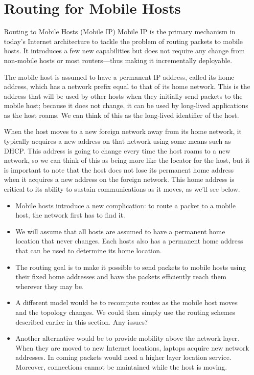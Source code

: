 \documentclass[twoside]{article}
\begin{document}
\section*{Routing for Mobile Hosts}
Routing to Mobile Hosts (Mobile IP) Mobile IP is the primary mechanism in today's Internet architecture to tackle the problem of routing packets to mobile hosts. It introduces a few new capabilities but does not require any change from non-mobile hosts or most routers—thus making it incrementally deployable.

\newline The mobile host is assumed to have a permanent IP address, called its home address, which has a network prefix equal to that of its home network. This is the address that will be used by other hosts when they initially send packets to the mobile host; because it does not change, it can be used by long-lived applications as the host roams. We can think of this as the long-lived identifier of the host.

\newline When the host moves to a new foreign network away from its home network, it typically acquires a new address on that network using some means such as DHCP. This address is going to change every time the host roams to a new network, so we can think of this as being more like the locator for the host, but it is important to note that the host does not lose its permanent home address when it acquires a new address on the foreign network. This home address is critical to its ability to sustain communications as it moves, as we'll see below.
\begin{itemize}
    \item Mobile hosts introduce a new complication: to route a packet to a
mobile host, the network first has to find it.
    \item We will assume that all hosts are assumed to have a permanent
home location that never changes. Each hosts also has a permanent
home address that can be used to determine its home location.
    \item The routing goal is to make it possible to send packets to mobile
hosts using their fixed home addresses and have the packets efficiently
reach them wherever they may be.
    \item A different model would be to recompute routes as the mobile host
moves and the topology changes. We could then simply use the
routing schemes described earlier in this section. Any issues?
    \item Another alternative would be to provide mobility above the network
layer. When they are moved to new Internet locations, laptops
acquire new network addresses. In coming packets would need a
higher layer location service. Moreover, connections cannot be
maintained while the host is moving.
\end{itemize}
\end{document}
